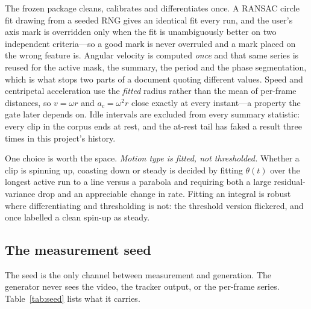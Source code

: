 \documentclass[conference]{IEEEtran}
\newcommand{\ac}{a_{c}}
\begin{document}
The frozen package cleans, calibrates and differentiates once. A RANSAC circle
fit drawing from a seeded RNG gives an identical fit every run, and the user's
axis mark is overridden only when the fit is unambiguously better on two
independent criteria---so a good mark is never overruled and a mark placed on
the wrong feature is. Angular velocity is computed \emph{once} and that same
series is reused for the active mask, the summary, the period and the phase
segmentation, which is what stops two parts of a document quoting different
values. Speed and centripetal acceleration use the \emph{fitted} radius rather
than the mean of per-frame distances, so $v = \omega r$ and
$\ac = \omega^{2} r$ close exactly at every instant---a property the gate later
depends on. Idle intervals are excluded from every summary statistic: every clip
in the corpus ends at rest, and the at-rest tail has faked a result three times
in this project's history.

One choice is worth the space. \emph{Motion type is fitted, not thresholded.}
Whether a clip is spinning up, coasting down or steady is decided by fitting
$\theta(t)$ over the longest active run to a line versus a parabola and
requiring both a large residual-variance drop and an appreciable change in rate.
Fitting an integral is robust where differentiating and thresholding is not: the
threshold version flickered, and once labelled a clean spin-up as steady.

\subsection{The measurement seed}
\label{sec:seed}

The seed is the only channel between measurement and generation. The generator
never sees the video, the tracker output, or the per-frame series.
Table~\ref{tab:seed} lists what it carries.
\end{document}
